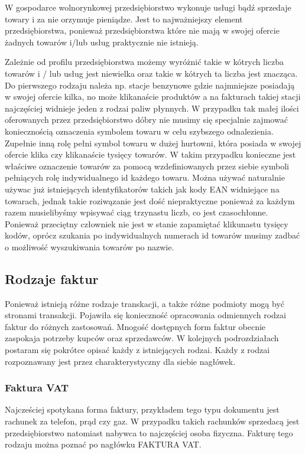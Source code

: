 \documentclass[12pt, a4paper]{article}
\begin{document}
W gospodarce wolnorynkowej przedsiębiorstwo wykonuje usługi bądź sprzedaje
towary i za nie orzymuje pieniądze. Jest to najważniejszy element
przedsiębiorstwa, ponieważ przedsiębiorstwa które nie mają w swojej ofercie
żadnych towarów i/lub usług praktycznie nie istnieją.

Zależnie od profilu przedsiębiorstwa możemy wyróżnić takie w kótrych liczba
towarów i / lub usług jest niewielka oraz takie w kótrych ta liczba jest
znacząca. Do pierwszego rodzaju należa np. stacje benzynowe gdzie najmniejsze
posiadają w swojej ofercie kilka, no może klikanaście produktów a na fakturach
takiej stacji najczęściej widnieje jeden z rodzai paliw płynnych. W przypadku
tak małej ilości oferowanych przez przedsiębiorstwo dóbry nie musimy się
specjalnie zajmować koniecznością oznaczenia symbolem towaru w celu szybszego
odnalezienia. Zupełnie inną rolę pełni symbol towaru w dużej hurtowni, która
posiada w swojej ofercie klika czy klikanaście tysięcy towarów. W takim
przypadku konieczne jest właściwe oznaczenie towarów za pomocą wzdefiniowanych
przez siebie symboli pełniących rolę indywidualnego id każdego towaru. Można
używać naturalnie używac już istniejących identyfikatorów takich jak kody EAN
widniejące na towarach, jednak takie roziwązanie jest dość niepraktyczne
ponieważ za każdym razem musielibyśmy wpisywać ciąg trzynastu liczb, co jest
czasochłonne. Ponieważ przeciętny człowniek nie jest w stanie zapamiętać
klikunastu tysięcy kodów, oprócz szukania po indywidualnych numerach id towarów
musimy zadbać o możliwość wyszukiwania towarów po nazwie.
\subsection{Rodzaje faktur}
\label{rodzajeFaktur}
Ponieważ istnieją różne rodzaje transkacji, a także różne podmioty mogą być
stronami transakcji. Pojawiła się konieczność opracowania odmiennych rodzai
faktur do różnych zastosowań. Mnogość dostępnych form faktur obecnie zaspokaja
potrzeby kupców oraz sprzedawców. W kolejnych podrozdziałach postaram się
pokrótce opisać każdy z istniejących rodzai. Każdy z rodzai rozpoznawany jest
przez charakterystyczny dla siebie nagłówek.
\subsubsection{Faktura VAT}
Najcześciej spotykana forma faktury, przykładem tego typu dokumentu jest
rachunek za telefon, prąd czy gaz.
W przypadku takich rachunków sprzedacą jest przedsiębiorstwo natomiast nabywca to najczęściej osoba fizyczna.
Fakturę tego rodzaju można poznać po nagłówku FAKTURA VAT.
\end{document}
